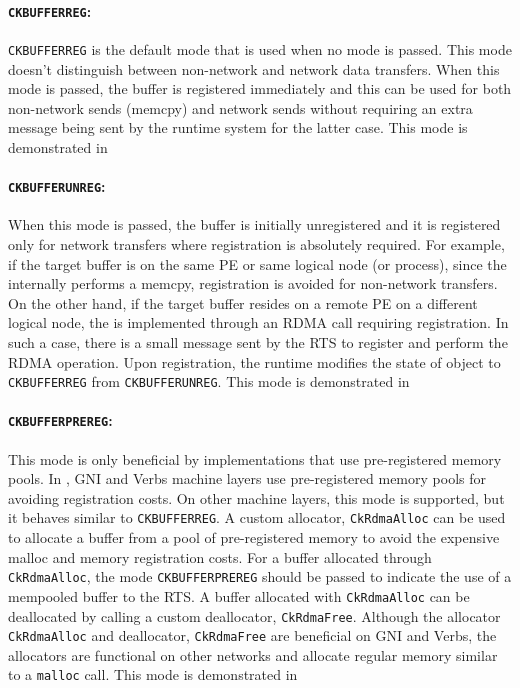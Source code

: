 \paragraph{\texttt{CK\textunderscore BUFFER\textunderscore REG}:}
\texttt{CK\textunderscore BUFFER\textunderscore REG} is the default mode that
is used when no mode is passed. This mode doesn't distinguish between
non-network and network data transfers. When this mode is passed, the buffer
is registered immediately and this can be used for both non-network sends (memcpy)
and network sends without requiring an extra message being sent by the runtime system
for the latter case. This mode is demonstrated in

\paragraph{\texttt{CK\textunderscore BUFFER\textunderscore UNREG}:}
When this mode is passed, the buffer is initially unregistered and it is
registered only for network transfers where registration is absolutely required.
For example, if the target buffer is on the same PE or same logical node (or process),
since the  internally performs a memcpy, registration is avoided for non-network
transfers. On the other hand, if the target buffer resides on a remote PE on a different
logical node, the  is implemented through an RDMA call requiring registration.
In such a case, there is a small message sent by the RTS to register and perform
the RDMA operation. Upon registration, the runtime modifies the state of 
object to \texttt{CK\textunderscore BUFFER\textunderscore REG} from
\texttt{CK\textunderscore BUFFER\textunderscore UNREG}. This mode is demonstrated in

\paragraph{\texttt{CK\textunderscore BUFFER\textunderscore PREREG}:}
This mode is only beneficial by implementations that use pre-registered memory pools.
In \charmpp{}, GNI and Verbs machine layers use pre-registered memory pools for avoiding
registration costs. On other machine layers, this mode is supported, but it behaves similar
to \texttt{CK\textunderscore BUFFER\textunderscore REG}. A custom allocator, \texttt{CkRdmaAlloc}
can be used to allocate a buffer from a pool of pre-registered memory to avoid the expensive malloc
and memory registration costs. For a buffer allocated through \texttt{CkRdmaAlloc}, the mode
\texttt{CK\textunderscore BUFFER\textunderscore PREREG} should be passed to indicate the use of a
mempooled buffer to the RTS. A buffer allocated with \texttt{CkRdmaAlloc} can be deallocated by
calling a custom deallocator, \texttt{CkRdmaFree}. Although the allocator \texttt{CkRdmaAlloc} and
deallocator, \texttt{CkRdmaFree} are beneficial on GNI and Verbs, the allocators are functional on other
networks and allocate regular memory similar to a \texttt{malloc} call. This mode is demonstrated in

